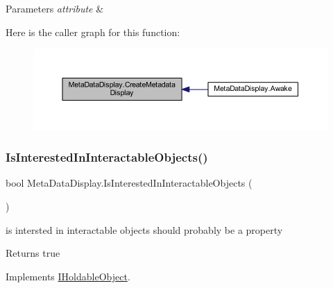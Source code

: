 \begin{DoxyParams}{Parameters}
{\em attribute} & \\
\hline
\end{DoxyParams}
Here is the caller graph for this function\+:
\nopagebreak
\begin{figure}[H]
\begin{center}
\leavevmode
\includegraphics[width=350pt]{class_meta_data_display_a9306b452a284969cbca1414a034eb5c9_icgraph}
\end{center}
\end{figure}
\mbox{\label{class_meta_data_display_a6aa943864ef85667977a13c895c2ce23}} 
\subsubsection{\texorpdfstring{Is\+Interested\+In\+Interactable\+Objects()}{IsInterestedInInteractableObjects()}}
{\footnotesize\ttfamily bool Meta\+Data\+Display.\+Is\+Interested\+In\+Interactable\+Objects (\begin{DoxyParamCaption}{ }\end{DoxyParamCaption})}



is intersted in interactable objects should probably be a property 

\begin{DoxyReturn}{Returns}
true
\end{DoxyReturn}


Implements \mbox{\hyperlink{interface_i_holdable_object_a0356d534c17ab4e04fba00b42abeea77}{I\+Holdable\+Object}}.

\mbox{\label{class_meta_data_display_a274478924e6a4df19484a469ae2869ce}} 
